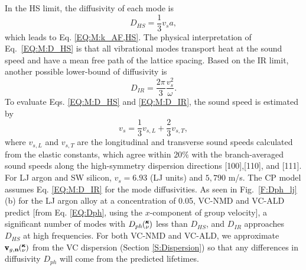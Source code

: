 \documentclass[12pt,twocolumn,iop]{/usr/share/texmf-texlive/tex/latex/iop/iopart}[/usr/share/texmf-texlive/tex/latex/iop/]
\newcommand{\kv}{\mspace{-4.0mu}\left(\mspace{-8.0mu}
\begin{smallmatrix}&\pmb{\kappa} \\&\nu\end{smallmatrix}
\mspace{-3.0mu}\right)}
\begin{document}
In the HS limit,\cite{cahill_lattice_1988} 
the diffusivity of each mode is
\begin{equation}\label{EQ:M:D_HS}
D_{HS} = \frac{1}{3} v_s a,
\end{equation}
which leads to Eq. \eqref{EQ:M:k_AF,HS}. 
The physical interpretation of Eq.~\eqref{EQ:M:D_HS} 
is that all vibrational modes transport heat at the sound speed 
and have a mean free path of the lattice spacing. 
Based on the IR limit, another possible lower-bound of 
diffusivity is  
\begin{equation}\label{EQ:M:D_IR}
D_{IR} = \frac{2\pi}{3} \frac{v^2_s}{\omega}. 
\end{equation} 
To evaluate Eqs. \eqref{EQ:M:D_HS} and \eqref{EQ:M:D_IR}, 
the sound speed is estimated by 
\begin{equation}\label{EQ:M:vs}
v_s = \frac{1}{3}v_{s,L} + \frac{2}{3}v_{s,T},
\end{equation}
where $v_{s,L}$ and $v_{s,T}$ are the longitudinal and transverse 
sound speeds calculated from the elastic constants,
\cite{gale_general_2003} which agree within 20$\%$ with the 
branch-averaged sound speeds along the high-symmetry dispersion 
directions [100],[110], and [111]. For LJ argon and SW silicon, 
$v_s = 6.93$ (LJ units) and $5,790$ m/s. 
The CP model assumes Eq. \eqref{EQ:M:D_IR} for the mode 
diffusivities.\cite{cahill_lattice_1988} 
As seen in Fig.~\ref{F:Dph_lj}(b) for the LJ argon alloy at 
a concentration of 0.05, VC-NMD and VC-ALD predict [from 
Eq. \eqref{EQ:Dph}, using the $x$-component of group velocity], a 
significant number of modes with  
$D_{ph}\kv$ less than $D_{HS}$, and $D_{IR}$ approaches $D_{HS}$ at 
high frequencies. For both VC-NMD and VC-ALD, we 
approximate $\pmb{\text{v}}_{g,\mathbf{n}}\kv$ from the VC dispersion 
(Section \ref{S:Dispersion}) so that any differences in 
diffusivity $D_{ph}$ will come from the predicted lifetimes.  
\end{document}
